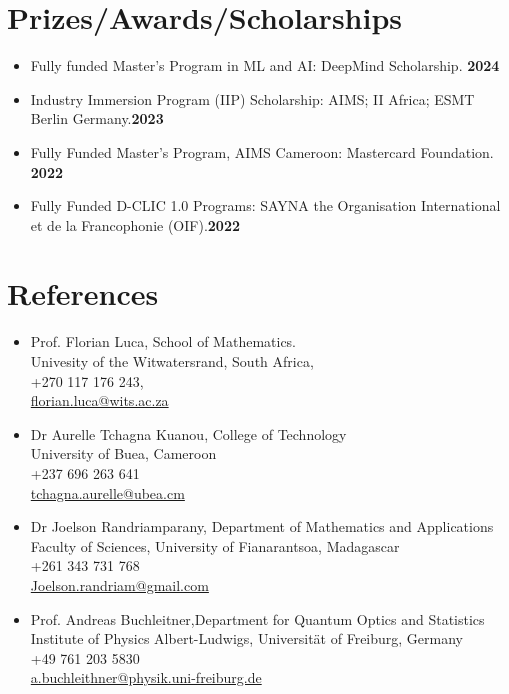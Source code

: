 \documentclass[a4paper, oneside]{article}
\newlength{\lfonts}
\begin{document}
\section{Prizes/Awards/Scholarships}
\begin{itemize}
	\item[\faTrophy] Fully funded Master's Program in ML and AI: DeepMind Scholarship. \hfill \textbf{\color{emphasis}2024}
	\item[\faTrophy] Industry Immersion Program (IIP) Scholarship: AIMS; II Africa; ESMT Berlin Germany.\hfill \textbf{\color{emphasis}2023}
	\item[\faTrophy] Fully Funded Master's Program, AIMS Cameroon: Mastercard Foundation. \hfill \textbf{\color{emphasis}2022}
	\item[\faTrophy] Fully Funded D-CLIC 1.0 Programs: SAYNA  the Organisation International et de la Francophonie (OIF).\hfill \textbf{\color{emphasis}2022}
\end{itemize}
\section{References}
\begin{itemize}
	\item Prof. Florian Luca, School of Mathematics.\\
		Univesity of the Witwatersrand, South Africa,\\
		+270 117 176 243,\\
		\href{florian.luca@wits.ac.za}{florian.luca@wits.ac.za}
	\item Dr Aurelle Tchagna Kuanou, College of Technology\\
	University of Buea, Cameroon\\
	+237 696 263 641\\
	\href{tchagna.aurelle@ubea.cm}{tchagna.aurelle@ubea.cm}
	\item Dr Joelson Randriamparany, Department of Mathematics and Applications\\
	Faculty of Sciences, University of Fianarantsoa, Madagascar\\
	+261 343 731 768\\
	\href{Joelson.randriam@gmail.com}{Joelson.randriam@gmail.com}

	\item Prof. Andreas Buchleitner,Department for Quantum Optics and Statistics\\
		Institute of Physics Albert-Ludwigs, Universität of Freiburg, Germany \\
		+49 761 203 5830\\
		\href{a.buchleithner@physik.uni-freiburg.de}{a.buchleithner@physik.uni-freiburg.de}
\end{itemize}
\end{document}
